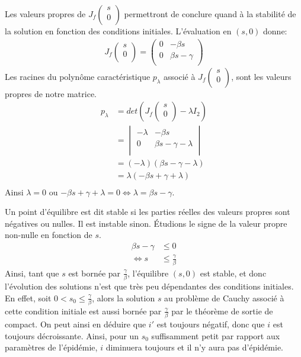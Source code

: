 \documentclass[a4paper]{article}
\theoremstyle{plain}
\theoremstyle{definition}
\theoremstyle{remark}
\begin{document}
Les valeurs propres de $ J_f\begin{pmatrix}
s\\ 0\\
\end{pmatrix}$ permettront de conclure quand à la stabilité de la solution en fonction des conditions initiales. 
L'évaluation en $(s,0)$ donne:
\begin{align}
J_f\begin{pmatrix}
s\\ 0\\
\end{pmatrix}
=\begin{pmatrix}
0&-\beta s\\
0&\beta s-\gamma\\
\end{pmatrix}
\end{align}
Les racines du polynôme caractéristique $p_{\lambda}$ associé à $ J_f\begin{pmatrix}
s\\ 0\\
\end{pmatrix}$, sont les valeurs propres de notre matrice.
\begin{align*}
p_{\lambda}&=det(J_f\begin{pmatrix}
s\\ 0\\
\end{pmatrix}-\lambda I_{2})\\
&=\begin{vmatrix}
-\lambda&-\beta s\\
0&\beta s-\gamma-\lambda\\
\end{vmatrix}\\
&=(-\lambda)(\beta s-\gamma-\lambda)\\
&=\lambda(-\beta s+\gamma+\lambda)\\
\end{align*}
Ainsi $\lambda=0$ ou $-\beta s+\gamma+\lambda=0 \Leftrightarrow\lambda=\beta s-\gamma$.

Un point d'équilibre est dit stable si les parties réelles des valeurs propres sont négatives ou nulles. Il est instable sinon. Étudions le signe de la valeur propre non-nulle en fonction de $s$.
\begin{align*}
\beta s-\gamma & \leqslant0\\
\Leftrightarrow s & \leqslant\frac{\gamma}{\beta}
\end{align*}
Ainsi, tant que $s$ est bornée par $\frac{\gamma}{\beta}$, l'équilibre $(s,0)$ est stable, et donc l'évolution des solutions n'est que très peu dépendantes des conditions initiales. \\
En effet, soit $0<s_0\leqslant\frac{\gamma}{\beta}$, alors la solution $s$ au problème de Cauchy associé à cette condition initiale est aussi bornée par $\frac{\gamma}{\beta}$ par le théorème de sortie de compact. On peut ainsi en déduire que $i'$ est toujours négatif, donc que $i$ est toujours décroissante. Ainsi, pour un $s_0$ suffisamment petit par rapport aux paramètres de l'épidémie, $i$ diminuera toujours et il n'y aura pas d'épidémie.
\end{document}

